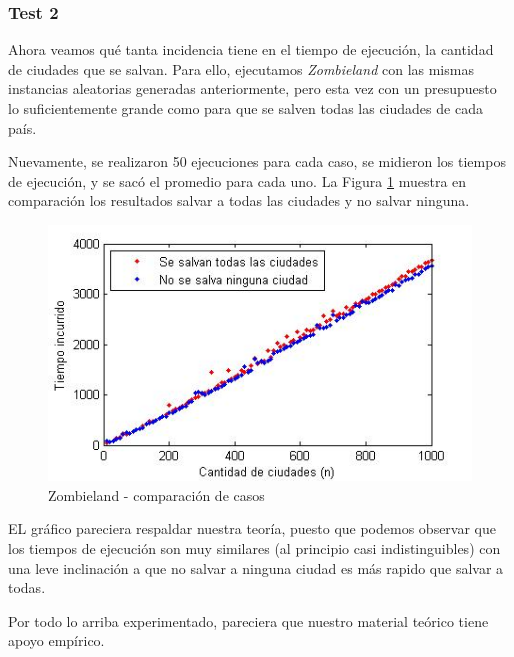 \vspace*{0.6cm}
\subsubsection{Test 2}

\vspace*{0.3cm}

Ahora veamos qué tanta incidencia tiene en el tiempo de ejecución, la cantidad de ciudades que se salvan.  Para ello, ejecutamos {\it Zombieland} con las mismas instancias aleatorias generadas anteriormente, pero esta vez con un presupuesto lo suficientemente grande como para que se salven todas las ciudades de cada país.

Nuevamente, se realizaron 50 ejecuciones para cada caso, se midieron los tiempos de ejecución, y se sacó el promedio para cada uno.  La Figura \ref{fig:1-comp} muestra en comparación los resultados salvar a todas las ciudades y no salvar ninguna.

\begin{figure}[htb]
	\begin{center}
    		\includegraphics[scale=0.5]{imagenes/1-comparacion.jpg}
	\end{center}
	\caption{Zombieland - comparación de casos}\label{fig:1-comp}
\end{figure}

EL gráfico pareciera respaldar nuestra teoría, puesto que podemos observar que los tiempos de ejecución son muy similares (al principio casi indistinguibles) con una leve inclinación a que no salvar a ninguna ciudad es más rapido que salvar a todas.

Por todo lo arriba experimentado, pareciera que nuestro material teórico tiene apoyo empírico.